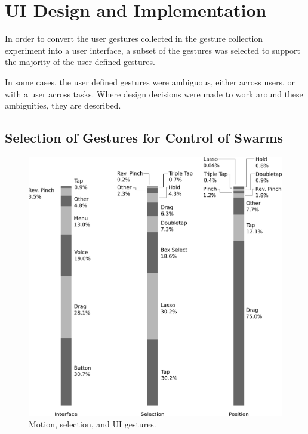 \chapter{UI Design and Implementation}
\thispagestyle{fancy}

In order to convert the user gestures collected in the gesture collection experiment into a user interface, a subset of the gestures was selected to support the majority of the user-defined gestures. 

In some cases, the user defined gestures were ambiguous, either across users, or with a user across tasks. 
Where design decisions were made to work around these ambiguities, they are described. 

\section{Selection of Gestures for Control of Swarms}

\begin{figure}
	\centering
	\includegraphics[width=\linewidth]{../thin_grey_text.png}
	\caption{Motion, selection, and UI gestures.}
	\label{fig:select_ui_move_breakdown}
\end{figure}

